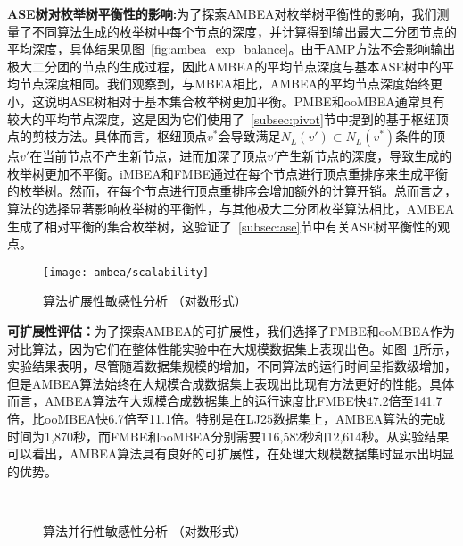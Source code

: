 \textbf{ASE树对枚举树平衡性的影响:}为了探索AMBEA对枚举树平衡性的影响，我们测量了不同算法生成的枚举树中每个节点的深度，并计算得到输出最大二分团节点的平均深度，具体结果见图~\ref{fig:ambea_exp_balance}。由于AMP方法不会影响输出极大二分团的节点的生成过程，因此AMBEA的平均节点深度与基本ASE树中的平均节点深度相同。我们观察到，与MBEA相比，AMBEA的平均节点深度始终更小，这说明ASE树相对于基本集合枚举树更加平衡。PMBE和ooMBEA通常具有较大的平均节点深度，这是因为它们使用了~\ref{subsec:pivot}节中提到的基于枢纽顶点的剪枝方法。具体而言，枢纽顶点$v^*$会导致满足$N_L(v')\subset N_L(v^*)$条件的顶点$v'$在当前节点不产生新节点，进而加深了顶点$v'$产生新节点的深度，导致生成的枚举树更加不平衡。iMBEA和FMBE通过在每个节点进行顶点重排序来生成平衡的枚举树。然而，在每个节点进行顶点重排序会增加额外的计算开销。总而言之，算法的选择显著影响枚举树的平衡性，与其他极大二分团枚举算法相比，AMBEA生成了相对平衡的集合枚举树，这验证了~\ref{subsec:ase}节中有关ASE树平衡性的观点。

\begin{figure} [H]
	\centering
	\texttt{[image: ambea/scalability]}
	\caption{算法扩展性敏感性分析 （对数形式）}
	\label{fig:ambea_exp_scalability}
\end{figure}

\textbf{可扩展性评估：}为了探索AMBEA的可扩展性，我们选择了FMBE和ooMBEA作为对比算法，因为它们在整体性能实验中在大规模数据集上表现出色。如图~\ref{fig:ambea_exp_scalability}所示，实验结果表明，尽管随着数据集规模的增加，不同算法的运行时间呈指数级增加，但是AMBEA算法始终在大规模合成数据集上表现出比现有方法更好的性能。具体而言，AMBEA算法在大规模合成数据集上的运行速度比FMBE快47.2倍至141.7倍，比ooMBEA快6.7倍至11.1倍。特别是在LJ25数据集上，AMBEA算法的完成时间为1,870秒，而FMBE和ooMBEA分别需要116,582秒和12,614秒。从实验结果可以看出，AMBEA算法具有良好的可扩展性，在处理大规模数据集时显示出明显的优势。


\begin{figure} [H]
	\centering
  \quad
  \\
  \quad
  

	\caption{算法并行性敏感性分析 （对数形式）}
	\label{fig:ambea_paral}
\end{figure}

